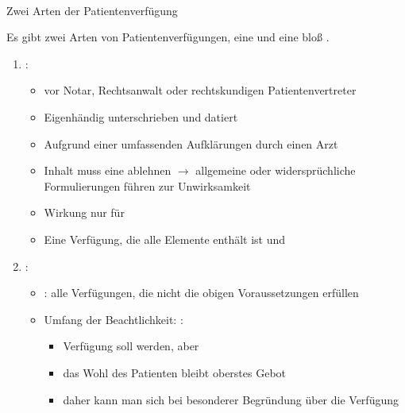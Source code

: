\paragraph{}
\Text
{Zwei Arten der Patientenverfügung}%
{%
Es gibt zwei Arten von Patientenverfügungen, eine
 und eine
bloß . 


\begin{enumerate}
  \item {}:
  \begin{itemize}
    \item {} vor Notar, Rechtsanwalt oder
    rechtskundigen Patientenvertreter
    \item Eigenhändig unterschrieben und datiert
    \item Aufgrund einer umfassenden Aufklärungen durch
    einen Arzt
    \item Inhalt muss eine 
    ablehnen ${\rightarrow}$ allgemeine oder
    widersprüchliche Formulierungen führen zur Unwirksamkeit
    \item Wirkung nur für 
    \item Eine Verfügung, die alle Elemente enthält ist
     und 
  \end{itemize}
  \item {}:
  \begin{itemize}
    \item
    : alle Verfügungen, die nicht
    die obigen Voraussetzungen erfüllen
    \item
    Umfang der Beachtlichkeit: :
    \begin{itemize}
      \item
      Verfügung soll  werden, aber
      \item
      das Wohl des Patienten bleibt oberstes Gebot
      \item
      daher kann man sich bei besonderer Begründung über die Verfügung
    \end{itemize}
  \end{itemize}
\end{enumerate}
}%


